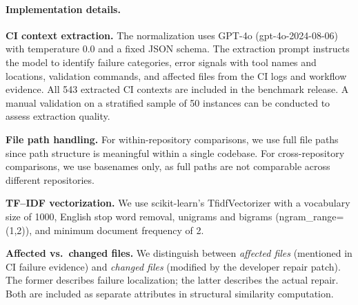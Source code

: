 
\paragraph{Implementation details.}

\textbf{CI context extraction.}
The normalization uses GPT-4o (gpt-4o-2024-08-06) with temperature 0.0
and a fixed JSON schema. The extraction prompt instructs the model to
identify failure categories, error signals with tool names and locations,
validation commands, and affected files from the CI logs and workflow
evidence. All 543 extracted CI contexts are included in the benchmark
release. A manual validation on a stratified sample of 50 instances can
be conducted to assess extraction quality.

\textbf{File path handling.}
For within-repository comparisons, we use full file paths since path
structure is meaningful within a single codebase. For cross-repository
comparisons, we use basenames only, as full paths are not comparable
across different repositories.

\textbf{TF--IDF vectorization.}
We use scikit-learn's TfidfVectorizer with a vocabulary size of 1000,
English stop word removal, unigrams and bigrams (ngram\_range=(1,2)),
and minimum document frequency of 2.

\textbf{Affected vs.\ changed files.}
We distinguish between \emph{affected files} (mentioned in CI failure
evidence) and \emph{changed files} (modified by the developer repair
patch). The former describes failure localization; the latter describes
the actual repair. Both are included as separate attributes in
structural similarity computation.
